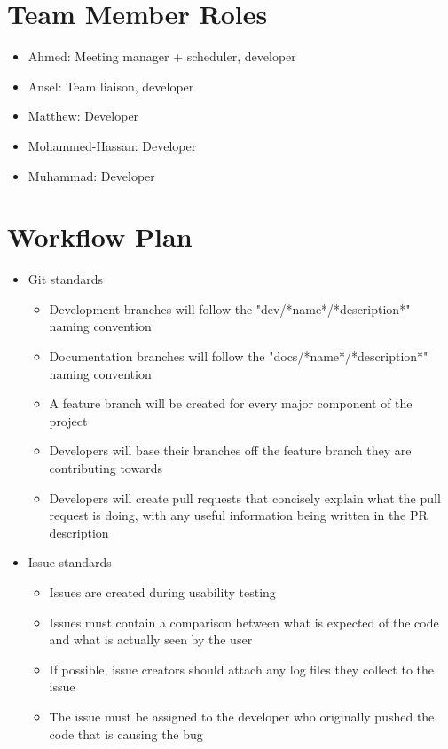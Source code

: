 \documentclass{article}
\begin{document}
\section{Team Member Roles}
\begin{itemize}
  \item Ahmed: Meeting manager + scheduler, developer
  \item Ansel: Team liaison, developer
  \item Matthew: Developer
  \item Mohammed-Hassan: Developer
  \item Muhammad: Developer
\end{itemize}

\section{Workflow Plan}

\begin{itemize}
	\item Git standards
  \begin{itemize}
    \item Development branches will follow the "dev/*name*/*description*" naming convention
    \item Documentation branches will follow the "docs/*name*/*description*" naming convention
    \item A feature branch will be created for every major component of the project
    \item Developers will base their branches off the feature branch they are contributing towards
    \item Developers will create pull requests that concisely explain what the pull request is doing,
    with any useful information being written in the PR description
  \end{itemize}
	\item Issue standards
  \begin{itemize}
    \item Issues are created during usability testing
    \item Issues must contain a comparison between what is expected of the code
    and what is actually seen by the user
    \item If possible, issue creators should attach any log files they collect to the issue
    \item The issue must be assigned to the developer who originally pushed
    the code that is causing the bug
  \end{itemize}
\end{itemize}
\end{document}
